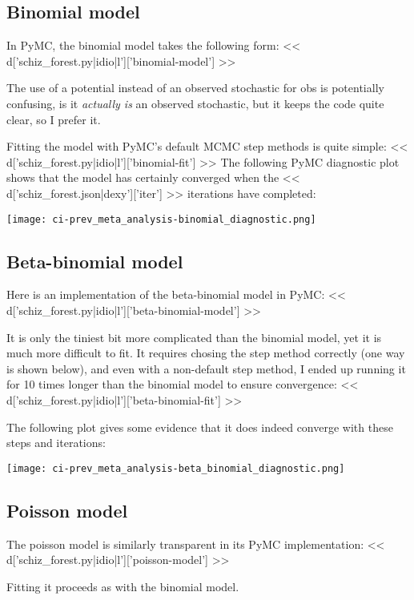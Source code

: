 \subsection{Binomial model}
In PyMC, the binomial model takes the following form: <<
d['schiz_forest.py|idio|l']['binomial-model'] >>

The use of a potential instead of an observed stochastic for obs is
potentially confusing, is it \emph{actually is} an observed
stochastic, but it keeps the code quite clear, so I prefer it.

Fitting the model with PyMC's default MCMC step methods is quite
simple:
<< d['schiz_forest.py|idio|l']['binomial-fit'] >>
The following PyMC diagnostic plot shows that the model has certainly
converged when the << d['schiz_forest.json|dexy']['iter'] >>
iterations have completed:
\begin{center}
\texttt{[image: ci-prev\_meta\_analysis-binomial\_diagnostic.png]}
\end{center}


\subsection{Beta-binomial model}
Here is an implementation of the beta-binomial model in PyMC:
<< d['schiz_forest.py|idio|l']['beta-binomial-model'] >>

It is only the tiniest bit more complicated than the binomial model,
yet it is much more difficult to fit.  It requires chosing the step
method correctly (one way is shown below), and even with a
non-default step method, I ended up running it for 10 times longer
than the binomial model to ensure convergence:
<< d['schiz_forest.py|idio|l']['beta-binomial-fit'] >>

The following plot gives some evidence that it does indeed converge
with these steps and iterations:
\begin{center}
\texttt{[image: ci-prev\_meta\_analysis-beta\_binomial\_diagnostic.png]}
\end{center}


\subsection{Poisson model}
The poisson model is similarly transparent in its PyMC implementation:
<< d['schiz_forest.py|idio|l']['poisson-model'] >>

Fitting it proceeds as with the binomial model.

